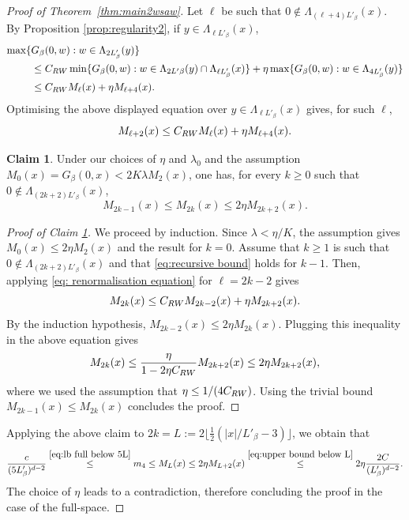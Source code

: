 \documentclass[11pt,a4paper]{article}
\numberwithin{equation}{section}
\theoremstyle{plain}
\theoremstyle{definition}
\newtheorem{Claim}[Thm]{Claim}
\begin{document}
\begin{proof}[Proof of Theorem~\textup{\ref{thm:main2wsaw}}]
Let $\ell$ be such that $0\notin \Lambda_{(\ell+4)L'_\beta}(x)$. By Proposition \ref{prop:regularity2}, if $y\in \Lambda_{\ell L'_\beta}(x)$,
\begin{align}\notag
	\max\{&G_\beta(0,w): w\in \Lambda_{2L'_\beta}(y)\}\\&\leq C_{\rm RW}\min\{G_\beta(0,w):w\in \Lambda_{2L'\beta}(y)\cap \Lambda_{\ell L_\beta'}(x)\}+\eta \max \{G_\beta(0,w):w\in \Lambda_{4L_\beta'}(y)\} \notag\\&\leq C_{\rm RW}M_\ell(x)+\eta M_{\ell+4}(x).\label{eq:recursive equation M}
\end{align}
Optimising the above displayed equation over $y\in \Lambda_{\ell L'_\beta}(x)$ gives, for such $\ell$,
\begin{equation}\label{eq: renormalisation equation}
M_{\ell+2}(x)\le C_{\rm RW}M_\ell(x)+\eta M_{\ell+4}(x).
\end{equation}

\begin{Claim}\label{claim: recursion} Under our choices of $\eta$ and $\lambda_0$ and the assumption $M_0(x)=G_\beta(0,x)<2K\lambda M_2(x)$, one has, for every $k\geq 0$ such that $0\notin \Lambda_{(2k+2)L'_\beta}(x)$,
\begin{equation}\label{eq:recursive bound}
M_{2k-1}(x)\le M_{2k}(x)\le 2\eta M_{2k+2}(x).\end{equation}
\end{Claim}
\begin{proof}[Proof of Claim \textup{\ref{claim: recursion}}] We proceed by induction. Since $\lambda<\eta/K$, the assumption gives $M_0(x)\leq 2\eta M_2(x)$ and the result for $k=0$. Assume that $k\geq 1$ is such that $0\notin \Lambda_{(2k+2)L'_\beta}(x)$ and that \eqref{eq:recursive bound} holds for $k-1$. Then, applying \eqref{eq: renormalisation equation} for $\ell=2k-2$ gives
\begin{equation}
	M_{2k}(x)\leq C_{\rm RW}M_{2k-2}(x)+\eta M_{2k+2}(x).
\end{equation}
By the induction hypothesis, $M_{2k-2}(x)\leq 2\eta M_{2k}(x)$. Plugging this inequality in the above equation gives
\begin{equation}
	M_{2k}(x)\leq \frac{\eta}{1-2\eta C_{\rm RW}}M_{2k+2}(x)\leq 2\eta M_{2k+2}(x),
\end{equation}
where we used the assumption that $\eta\leq 1/(4C_{\rm RW})$. Using the trivial bound $M_{2k-1}(x)\leq M_{2k}(x)$ concludes the proof.
\end{proof}
Applying the above claim to $2k=L:=2\lfloor \tfrac{1}{2}(|x|/L'_\beta-3)\rfloor$, we obtain that 
\begin{equation}
\frac{c}{(5L'_\beta)^{d-2}}\stackrel{\eqref{eq:lb full below 5L}}\le m_4\le M_{L}(x)\le 2\eta M_{L+2}(x)\stackrel{\eqref{eq:upper bound below L}}\le 2\eta \frac{2C}{(L'_\beta)^{d-2}}.\end{equation}
The choice of $\eta$  leads to a contradiction, therefore concluding the proof in the case of the full-space.


\end{proof}
\end{document}
